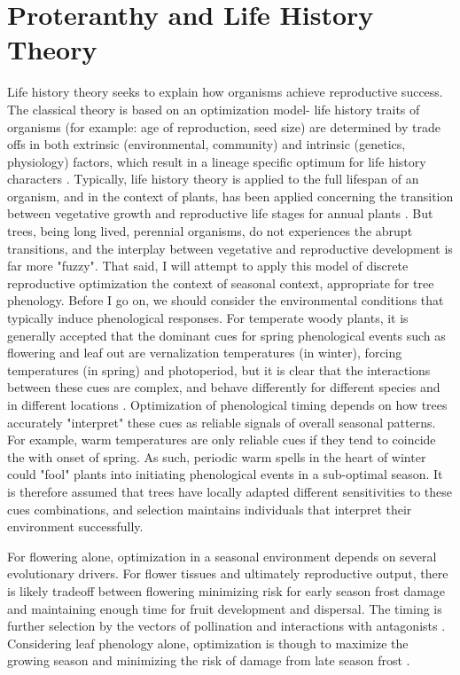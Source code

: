 \documentclass{article}\usepackage[]{graphicx}\usepackage[]{color}
\begin{document}
\section{Proteranthy and Life History Theory}
\par Life history theory seeks to explain how organisms achieve reproductive success. The classical theory is based on an optimization model- life history traits of organisms (for example: age of reproduction, seed size) are determined by trade offs in both extrinsic (environmental, community) and intrinsic (genetics, physiology) factors, which result in a lineage specific optimum for life history characters \citep{Stearns2000}.  Typically, life history theory is applied to the full lifespan of an organism, and in the context of plants, has been applied concerning the transition between vegetative growth and reproductive life stages for annual plants \citep{Glover2014}. But trees, being long lived, perennial organisms, do not experiences the abrupt transitions, and the interplay between vegetative and reproductive development is far more "fuzzy". That said, I will attempt to apply this model of discrete reproductive optimization the context of seasonal context, appropriate for tree phenology.
 Before I go on, we should consider the environmental conditions that typically induce phenological responses. For temperate woody plants, it is generally accepted that the dominant cues for spring phenological events such as flowering and leaf out are vernalization temperatures (in winter), forcing temperatures (in spring) and photoperiod, but it is clear that the interactions between these cues are complex, and behave differently for different species and in different locations \citep{Forrest2010}. Optimization of phenological timing depends on how trees accurately "interpret" these cues as reliable signals of overall seasonal patterns. For example, warm temperatures are only reliable cues if they tend to coincide the with onset of spring. As such, periodic warm spells in the heart of winter could "fool" plants into initiating phenological events in a sub-optimal season. It is therefore assumed that trees have locally adapted different sensitivities to these cues combinations, and selection maintains individuals that interpret their environment successfully. 
\par For flowering alone, optimization in a seasonal environment depends on several evolutionary drivers. For flower tissues and ultimately reproductive output, there is likely tradeoff between flowering minimizing risk for early season frost damage and maintaining enough time for fruit development and dispersal. The timing is further selection by the vectors of pollination and interactions with antagonists \citep{Austen2017}.  Considering leaf phenology alone, optimization is though to maximize the growing season and minimizing the risk of damage from late season frost \citep{Kramer1995}. 
\end{document}
